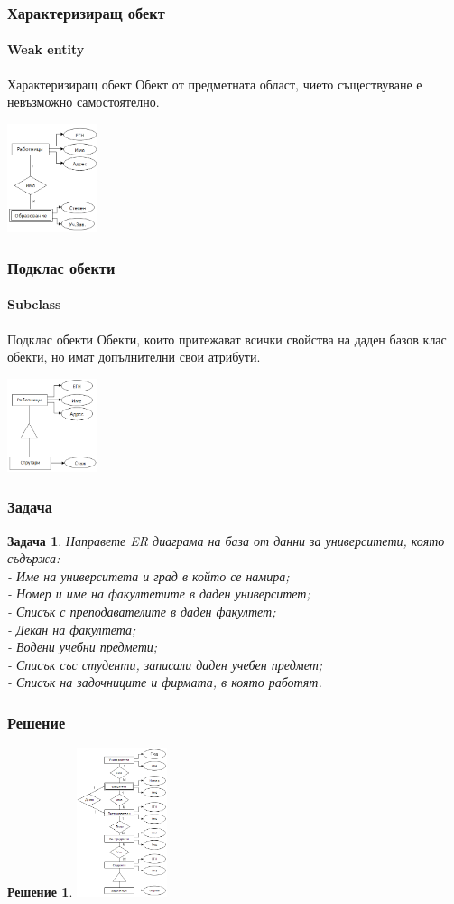 \documentclass{beamer}
\newtheorem{prob}{Задача}
\newtheorem{solv}{Решение}
\begin{document}
  \begin{frame}
    \frametitle{Характеризиращ обект}
    \framesubtitle{Weak entity}
    \begin{block}{Характеризиращ обект}
       Обект от предметната област, чието съществуване е невъзможно самостоятелно.
    \end{block}
    \includegraphics[width=100px]{img/weak_entity}
  \end{frame}

  \begin{frame}
    \frametitle{Подклас обекти}
    \framesubtitle{Subclass}
    \begin{block}{Подклас обекти}
      Обекти, които притежават всички свойства на даден базов клас обекти, но имат допълнителни свои атрибути.
    \end{block}
    \includegraphics[width=100px]{img/subclass}
  \end{frame}

  \begin{frame}
    \frametitle{Задача}
      \begin{prob}
        Направете ER диаграма на база от данни за университети, която съдържа:\\
        - Име на университета и град в който се намира;\\
        - Номер и име на факултетите в даден университет;\\
        - Списък с преподавателите в даден факултет;\\
        - Декан на факултета;\\
        - Водени учебни предмети;\\
        - Списък със студенти, записали даден учебен предмет;\\
        - Списък на задочниците и фирмата, в която работят.
      \end{prob}
  \end{frame}


  \begin{frame}
    \frametitle{Решение}
    \begin{solv}
      \includegraphics[width=100px]{img/problem1}
    \end{solv}
  \end{frame}
  
  
\end{document}
